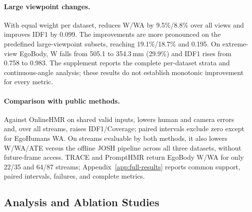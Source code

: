 \paragraph{Large viewpoint changes.}
With equal weight per dataset, \method{} reduces W/WA by 9.5\%/8.8\% over all
views and improves IDF1 by 0.099. The improvements are more pronounced on the
predefined large-viewpoint subsets, reaching 19.1\%/18.7\% and 0.195. On extreme-view
EgoBody, W falls from 505.1 to 354.3\,mm (29.9\%) and IDF1 rises from 0.758 to
0.983. The supplement reports the complete per-dataset strata and
continuous-angle analysis; these results do not establish monotonic
improvement for every metric.



\paragraph{Comparison with public methods.}
Against OnlineHMR on shared valid inputs, \method{} lowers human and camera
errors and, over all streams, raises IDF1/Coverage; paired intervals exclude
zero except for EgoHumans WA. On streams evaluable by both methods, it also
lowers W/WA/ATE versus the offline JOSH pipeline across all three datasets,
without future-frame access. TRACE and PromptHMR return EgoBody W/WA for only
22/35 and 64/87 streams; Appendix~\ref{app:full-results} reports common
support, paired intervals, failures, and complete metrics.

\subsection{Analysis and Ablation Studies}
\label{sec:ablation}

